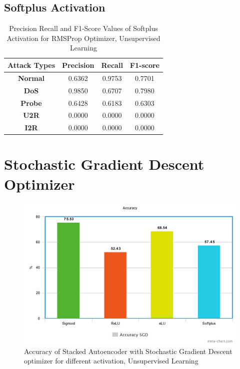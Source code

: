 \documentclass[12pt, a4paper]{report}
\begin{document}
\begin{appendices}
   \subsection{Softplus Activation}
  \begin{table}[h]
		\centering
		\captionsetup{justification=centering,margin=2cm}
		\begin{tabular}{|c|c|c|c|}
		\hline
		\textbf{Attack Types} & \textbf{Precision} & \textbf{Recall} & \textbf{F1-score} \\ \hline
		\textbf{Normal}       & 0.6362             & 0.9753          & 0.7701            \\ \hline
		\textbf{DoS}          & 0.9850             & 0.6707          & 0.7980            \\ \hline
		\textbf{Probe}        & 0.6428             & 0.6183          & 0.6303            \\ \hline
		\textbf{U2R}          & 0.0000             & 0.0000          & 0.0000            \\ \hline
		\textbf{I2R}          & 0.0000             & 0.0000          & 0.0000            \\ \hline
		\end{tabular}
		\caption{Precision Recall and F1-Score Values of Softplus Activation for RMSProp Optimizer, Unsupervised Learning}
		\label{classification softplus RMSProp tf}
		\end{table} 

 
\clearpage



\section{Stochastic Gradient Descent Optimizer}
  	\begin{figure}[ht]
	\centering
	\captionsetup{justification=centering,margin=2cm}
	\includegraphics[width=13cm]{SGD_accuracy_tensorflow.png}
	\caption{ Accuracy of Stacked Autoencoder with Stochastic Gradient Descent optimizer for different activation, Unsupervised Learning }
	\label{fig:acc_sgd_tf}
	\end{figure}
	

\end{appendices}
\end{document}
